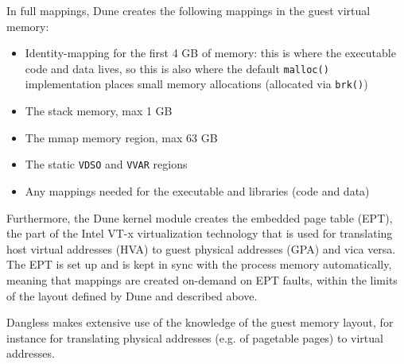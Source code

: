 In full mappings, Dune creates the following mappings in the guest virtual memory:

\begin{itemize}
	\item Identity-mapping for the first 4 GB of memory: this is where the executable code and data lives, so this is also where the default \lstinline!malloc()! implementation places small memory allocations (allocated via \lstinline!brk()!)
	\item The stack memory, max 1 GB
	\item The mmap memory region, max 63 GB
	\item The static \texttt{VDSO} and \texttt{VVAR} regions
	\item Any mappings needed for the executable and libraries (code and data)
\end{itemize}

Furthermore, the Dune kernel module creates the embedded page table (EPT), the part of the Intel VT-x virtualization technology that is used for translating host virtual addresses (HVA) to guest physical addresses (GPA) and vica versa. The EPT is set up and is kept in sync with the process memory automatically, meaning that mappings are created on-demand on EPT faults, within the limits of the layout defined by Dune and described above.

Dangless makes extensive use of the knowledge of the guest memory layout, for instance for translating physical addresses (e.g. of pagetable pages) to virtual addresses.
